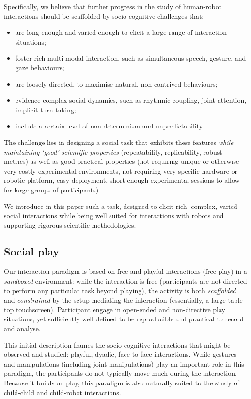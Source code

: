 \documentclass[sigconf]{acmart}
\begin{document}
Specifically, we believe that further progress in the study of human-robot
interactions should be scaffolded by socio-cognitive challenges that:

\begin{itemize}
    \item are long enough and varied enough to elicit a large range of
        interaction situations;
    \item foster rich multi-modal interaction, such as simultaneous speech, gesture, and gaze
        behaviours;
    \item are loosely directed, to maximise natural, non-contrived behaviours;
    \item evidence complex social dynamics, such as rhythmic coupling, joint attention,
        implicit turn-taking;
    \item include a certain level of non-determinism and unpredictability.
\end{itemize}

The challenge lies in designing a social task that exhibits these features
\emph{while maintaining `good' scientific properties} (repeatability, replicability,
robust metrics) as well as good practical properties (not requiring unique or
otherwise very costly experimental environments, not requiring very specific
hardware or robotic platform, easy deployment, short enough experimental
sessions to allow for large groups of participants).

We introduce in this paper such a task, designed to elicit rich, complex, varied
social interactions while being well suited for interactions with robots and
supporting rigorous scientific methodologies.

\subsection{Social play}

Our interaction paradigm is based on free and playful interactions (free play)
in a \emph{sandboxed} environment: while the interaction is free (participants
are not directed to perform any particular task beyond playing), the activity is
both \emph{scaffolded} and \emph{constrained} by the setup mediating the
interaction (essentially, a large table-top touchscreen).
Participant engage in open-ended and non-directive play situations, yet sufficiently
well defined to be reproducible and practical to record and analyse.

This initial description frames the socio-cognitive interactions that might be
observed and studied: playful, dyadic, face-to-face interactions. While gestures
and manipulations (including joint manipulations) play an important role in this
paradigm, the participants do not typically move much during the interaction.
Because it builds on play, this paradigm is also naturally suited to the study
of child-child and child-robot interactions.
\end{document}
